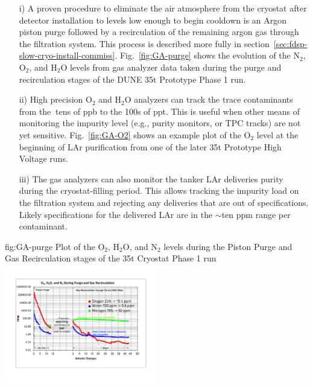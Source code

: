 \begin{enumerate}
\item[i)] A proven procedure to eliminate the air atmosphere from the cryostat after detector installation to levels low enough to begin cooldown is an Argon piston purge followed by a recirculation of the remaining argon gas through the filtration system. This process is described more fully in section~\ref{sec:fdsp-slow-cryo-install-commiss}. Fig.~\ref{fig:GA-purge} shows the evolution of the $\text{N}_2$, $\text{O}_2$, and $\text{H}_2\text{O}$ levels from gas analyzer data taken during the purge and recirculation stages of the DUNE \num{35}\si{t} Prototype Phase 1 run.

\item[ii)] High precision $\text{O}_2$ and $\text{H}_2\text{O}$ analyzers can track the trace contaminants from the $\>$tens of ppb to the 100s of ppt. This is useful when other means of monitoring the impurity level (e.g., purity monitors, or TPC tracks) are not yet sensitive. Fig.~\ref{fig:GA-O2} shows an example plot of the $\text{O}_2$ level at the beginning of LAr purification from one of the later \num{35}\si{t} Prototype High Voltage runs.

\item[iii)] The gas analyzers can also monitor the tanker LAr deliveries purity during the cryostat-filling period. This allows tracking the impurity load on the filtration system and rejecting any deliveries that are out of specifications. Likely specifications for the delivered LAr are in the $\sim$ten ppm range per contaminant.

\end{enumerate}

\begin{dunefigure}{fig:GA-purge}
  {Plot of the $\text{O}_2$, $\text{H}_2\text{O}$, and $\text{N}_2$ levels during the Piston Purge and Gas Recirculation stages of the \num{35}\si{t} Cryostat Phase 1 run}
  \includegraphics[width=0.5\textwidth]{figures/Phase1_purge_gas_recirculation.pdf}%
\end{dunefigure}


